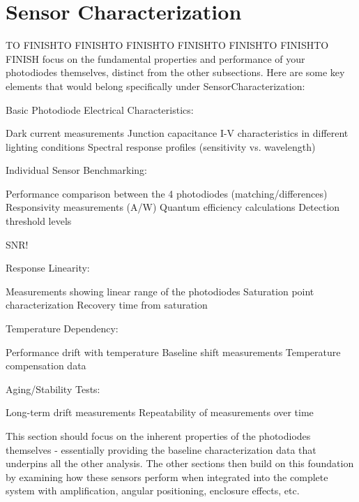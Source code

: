 \section{Sensor Characterization}
%
%
%
TO FINISHTO FINISHTO FINISHTO FINISHTO FINISHTO FINISHTO FINISH focus on the fundamental properties and performance of your photodiodes themselves, distinct from the other subsections. Here are some key elements that would belong specifically under SensorCharacterization:

Basic Photodiode Electrical Characteristics:

Dark current measurements
Junction capacitance
I-V characteristics in different lighting conditions
Spectral response profiles (sensitivity vs. wavelength)


Individual Sensor Benchmarking:

Performance comparison between the 4 photodiodes (matching/differences)
Responsivity measurements (A/W)
Quantum efficiency calculations
Detection threshold levels

SNR!

Response Linearity:

Measurements showing linear range of the photodiodes
Saturation point characterization
Recovery time from saturation


Temperature Dependency:

Performance drift with temperature
Baseline shift measurements
Temperature compensation data


Aging/Stability Tests:

Long-term drift measurements
Repeatability of measurements over time



This section should focus on the inherent properties of the photodiodes themselves - essentially providing the baseline characterization data that underpins all the other analysis. The other sections then build on this foundation by examining how these sensors perform when integrated into the complete system with amplification, angular positioning, enclosure effects, etc.




%

